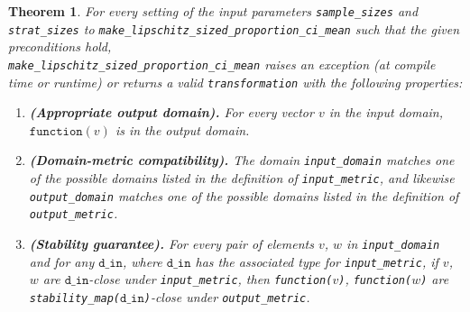 \documentclass[11pt,a4paper]{article}
\newtheorem{theorem}{Theorem}[section]
\newcommand{\din}{\texttt{d\_in}}
\newcommand{\function}{\texttt{function}}
\begin{document}
\begin{theorem} For every setting of the input parameters \texttt{sample\_sizes} and \texttt{strat\_sizes} to  \texttt{make\_lipschitz\_sized\_proportion\_ci\_mean} such that the given preconditions hold,\\ \texttt{make\_lipschitz\_sized\_proportion\_ci\_mean} raises an exception (at compile time or runtime) or returns a valid \texttt{transformation} with the following properties:
    \begin{enumerate}
        \item \textbf{\textup{(Appropriate output domain).}} For every vector $v$ in the input domain, $\function(v)$ is in the output domain.
        
        \item \textbf{\textup{(Domain-metric compatibility).}} The domain \texttt{input\_domain} matches one of the possible domains listed in the definition of \texttt{input\_metric}, and likewise \texttt{output\_domain} matches one of the possible domains listed in the definition of \texttt{output\_metric}.
        
        \item \textbf{\textup{(Stability guarantee).}} For every pair of elements $v$, $w$ in \texttt{input\_domain} and for any $\din$,  where $\din$ has the associated type for \texttt{input\_metric}, if $v$, $w$ are $\din$-close under \texttt{input\_metric}, then \texttt{function($v$)}, \texttt{function($w$)} are \texttt{stability\_map($\din$)}-close under \texttt{output\_metric}.
    \end{enumerate}
\end{theorem}
\end{document}
